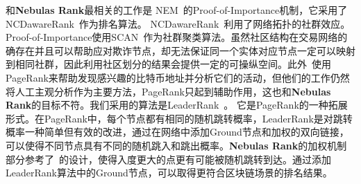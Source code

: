 和\textbf{Nebulas Rank}最相关的工作是 NEM~\cite{nem}的Proof-of-Importance机制，它采用了 NCDawareRank~\cite{Nikolakopoulos2013}作为排名算法。 NCDawareRank~\cite{Nikolakopoulos2013}利用了网络拓扑的社群效应。Proof-of-Importance使用SCAN~\cite{xu2007scan}\cite{shiokawa2015scan}\cite{chang2017mathsf}作为社群聚类算法。虽然社区结构在交易网络的确存在并且可以帮助应对欺诈节点，却无法保证同一个实体对应节点一定可以映射到相同社群，因此利用社区划分的结果会提供一定的可操纵空间。此外~\textcite{Fleder2015}使用PageRank来帮助发现感兴趣的比特币地址并分析它们的活动，但他们的工作仍然将人工主观分析作为主要方法，PageRank只起到辅助作用，这也和\textbf{Nebulas Rank}的目标不符。我们采用的算法是LeaderRank~\cite{Chen2013}\cite{Li2014}。 它是PageRank的一种拓展形式。在PageRank中，每个节点都有相同的随机跳转概率，LeaderRank是对跳转概率一种简单但有效的改进，通过在网络中添加Ground节点和加权的双向链接，可以使得不同节点具有不同的随机跳入和跳出概率。\textbf{Nebulas Rank}的加权机制部分参考了~\textcite{Li2014}的设计，使得入度更大的点更有可能被随机跳转到达。通过添加LeaderRank算法中的Ground节点，可以取得更符合区块链场景的排名结果。

